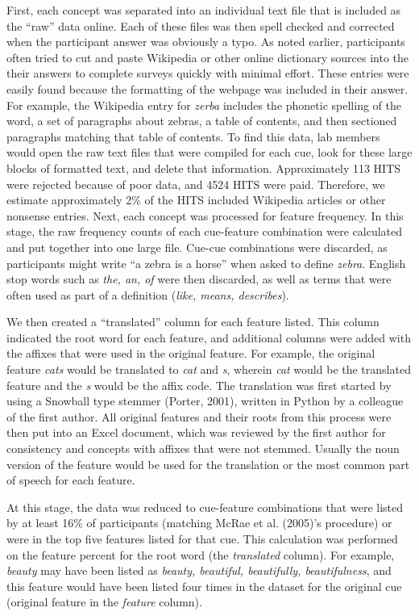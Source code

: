 \documentclass[english,,man]{apa6}
\theoremstyle{definition}
\theoremstyle{definition}
\theoremstyle{definition}
\theoremstyle{remark}
\begin{document}
First, each concept was separated into an individual text file that is
included as the \enquote{raw} data online. Each of these files was then
spell checked and corrected when the participant answer was obviously a
typo. As noted earlier, participants often tried to cut and paste
Wikipedia or other online dictionary sources into the their answers to
complete surveys quickly with minimal effort. These entries were easily
found because the formatting of the webpage was included in their
answer. For example, the Wikipedia entry for \emph{zerba} includes the
phonetic spelling of the word, a set of paragraphs about zebras, a table
of contents, and then sectioned paragraphs matching that table of
contents. To find this data, lab members would open the raw text files
that were compiled for each cue, look for these large blocks of
formatted text, and delete that information. Approximately 113 HITS were
rejected because of poor data, and 4524 HITS were paid. Therefore, we
estimate approximately 2\% of the HITS included Wikipedia articles or
other nonsense entries. Next, each concept was processed for feature
frequency. In this stage, the raw frequency counts of each cue-feature
combination were calculated and put together into one large file.
Cue-cue combinations were discarded, as participants might write
\enquote{a zebra is a horse} when asked to define \emph{zebra}. English
stop words such as \emph{the, an, of} were then discarded, as well as
terms that were often used as part of a definition (\emph{like, means,
describes}).

We then created a \enquote{translated} column for each feature listed.
This column indicated the root word for each feature, and additional
columns were added with the affixes that were used in the original
feature. For example, the original feature \emph{cats} would be
translated to \emph{cat} and \emph{s}, wherein \emph{cat} would be the
translated feature and the \emph{s} would be the affix code. The
translation was first started by using a Snowball type stemmer (Porter,
2001), written in Python by a colleague of the first author. All
original features and their roots from this process were then put into
an Excel document, which was reviewed by the first author for
consistency and concepts with affixes that were not stemmed. Usually the
noun version of the feature would be used for the translation or the
most common part of speech for each feature.

At this stage, the data was reduced to cue-feature combinations that
were listed by at least 16\% of participants (matching McRae et al.
(2005)'s procedure) or were in the top five features listed for that
cue. This calculation was performed on the feature percent for the root
word (the \emph{translated} column). For example, \emph{beauty} may have
been listed as \emph{beauty, beautiful, beautifully, beautifulness}, and
this feature would have been listed four times in the dataset for the
original cue (original feature in the \emph{feature} column).
\end{document}
